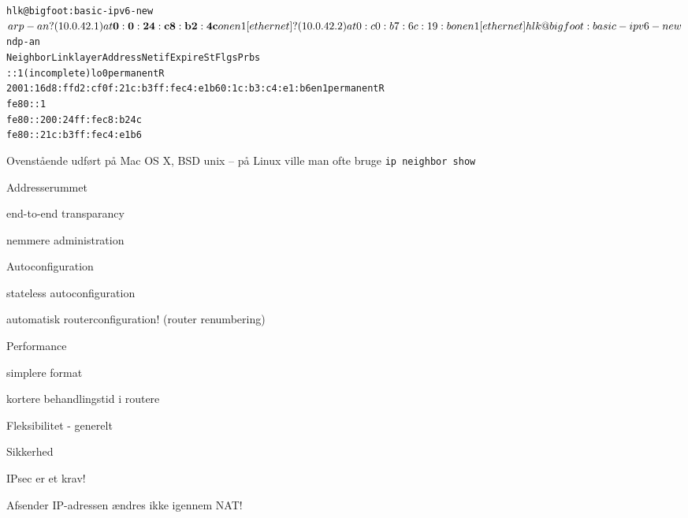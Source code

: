 \documentclass[Screen16to9,17pt]{foils}
\begin{document}

\begin{alltt}
\small
hlk@bigfoot:basic-ipv6-new$ arp -an
? (10.0.42.1) at{\bf 0:0:24:c8:b2:4c} on en1 [ethernet]
? (10.0.42.2) at 0:c0:b7:6c:19:b on en1 [ethernet]
hlk@bigfoot:basic-ipv6-new$ ndp -an
Neighbor                      Linklayer Address  Netif Expire    St Flgs Prbs
::1                           (incomplete)         lo0 permanent R
2001:16d8:ffd2:cf0f:21c:b3ff:fec4:e1b6 0:1c:b3:c4:e1:b6 en1 permanent R
fe80::1%lo0                   (incomplete)         lo0 permanent R
fe80::200:24ff:fec8:b24c%en1 {\bf 0:0:24:c8:b2:4c}      en1 8h54m51s  S  R
fe80::21c:b3ff:fec4:e1b6%en1  0:1c:b3:c4:e1:b6     en1 permanent R
\end{alltt}

Ovenstående udført på Mac OS X, BSD unix -- på Linux ville man ofte bruge \verb+ip neighbor show+


\begin{list1}
\item Addresserummet
\begin{list2}
\item end-to-end transparancy
\item 	nemmere administration
\end{list2}\item Autoconfiguration
\begin{list2}
\item stateless autoconfiguration
\item automatisk routerconfiguration!
(router renumbering)
\end{list2}
\item Performance
\begin{list2}
\item simplere format
\item kortere behandlingstid i routere
\end{list2}
\item Fleksibilitet - generelt
\item Sikkerhed
\begin{list2}
\item IPsec er et krav!
\item Afsender IP-adressen ændres ikke igennem NAT!
\end{list2}
\end{list1}

\end{document}
